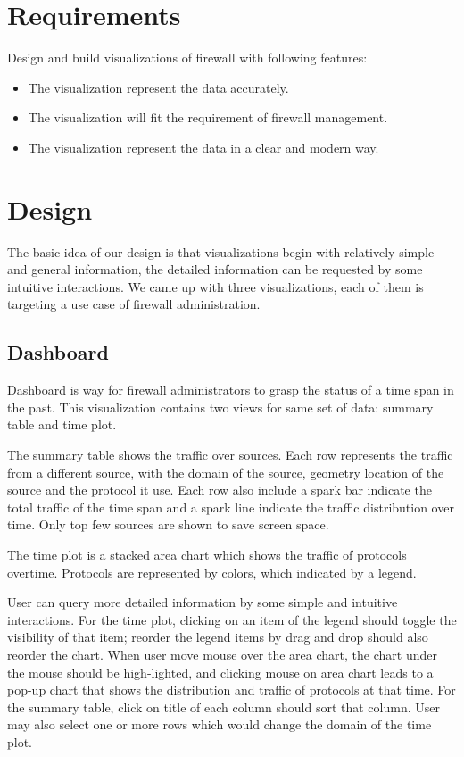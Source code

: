 \section{Requirements}
Design and build visualizations of firewall with following features:
\begin{itemize}
\item The visualization represent the data accurately.
\item The visualization will fit the requirement of firewall management.
\item The visualization represent the data in a clear and modern way. 
\end{itemize}

\section{Design}
The basic idea of our design is that visualizations begin with relatively simple and general information, the detailed information can be requested by some intuitive interactions. We came up with three visualizations, each of them is targeting a use case of firewall administration. 
\subsection{Dashboard}
Dashboard is way for firewall administrators to grasp the status of a time span in the past. This visualization contains two views for same set of data: summary table and time plot.

The summary table shows the traffic over sources. Each row represents the traffic from a different source, with the domain of the source, geometry location of the source and the protocol it use. Each row also include a spark bar indicate the total traffic of the time span and a spark line indicate the traffic distribution over time. Only top few sources are shown to save screen space.

The time plot is a stacked area chart which shows the traffic of protocols overtime. Protocols are represented by colors, which indicated by a legend.

User can query more detailed information by some simple and intuitive interactions. For the time plot, clicking on an item of the legend should toggle the visibility of that item; reorder the legend items by drag and drop should also reorder the chart. When user move mouse over the area chart, the chart under the mouse should be high-lighted, and clicking mouse on area chart leads to a pop-up chart that shows the distribution and traffic of protocols at that time. For the summary table, click on title of each column should sort that column. User may also select one or more rows which would change the domain of the time plot.

